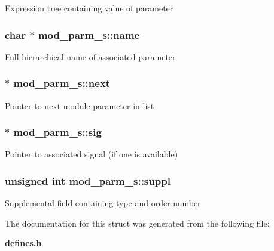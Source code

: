 Expression tree containing value of parameter 
\subsubsection{\setlength{\rightskip}{0pt plus 5cm}char $\ast$ mod\_\-parm\_\-s::name}\label{structmod__parm__s_m0}


Full hierarchical name of associated parameter 
\subsubsection{ $\ast$ mod\_\-parm\_\-s::next}\label{structmod__parm__s_m6}


Pointer to next module parameter in list 
\subsubsection{ $\ast$ mod\_\-parm\_\-s::sig}\label{structmod__parm__s_m5}


Pointer to associated signal (if one is available) 
\subsubsection{\setlength{\rightskip}{0pt plus 5cm}unsigned int mod\_\-parm\_\-s::suppl}\label{structmod__parm__s_m2}


Supplemental field containing type and order number 

The documentation for this struct was generated from the following file:\begin{CompactItemize}
\item 
{\bf defines.h}\end{CompactItemize}
